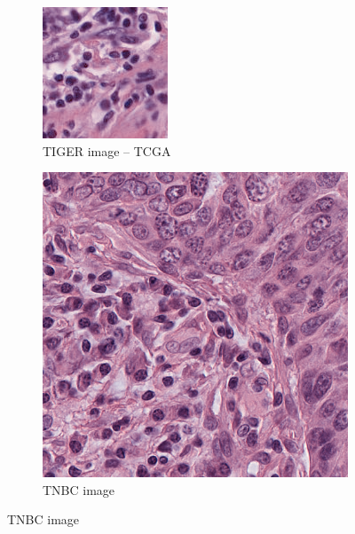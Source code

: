\begin{figure}[H]
  \par\vspace{0.5em} %

  \begin{subfigure}[b]{0.32\textwidth}
    \centering
    \includegraphics[width=\linewidth]{assets/images/for_presentation/norm_TCGA-EW-A1P8-01Z-00-DX1.E9852193-8CDD-49EF-B49B-DA6931198F0D_[8391, 13690, 8532, 13838].png}
    \caption{TIGER image – TCGA}
  \end{subfigure}\quad
  \begin{subfigure}[b]{0.32\textwidth}
    \centering
    \includegraphics[width=\linewidth]{assets/images/for_presentation/norm_10_1.png}
    \caption{TNBC image}
  \end{subfigure}


\end{figure}
